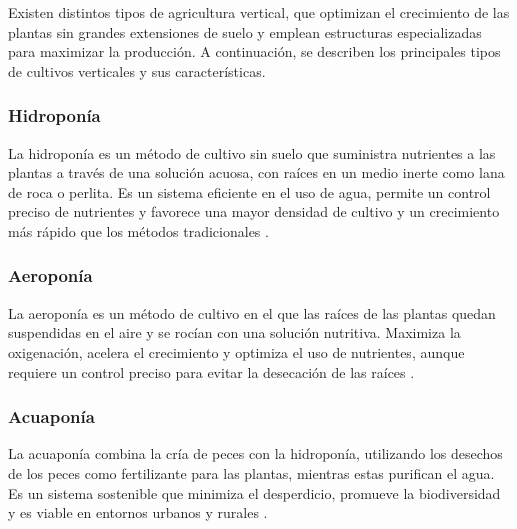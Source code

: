 

Existen distintos tipos de agricultura vertical, que optimizan el crecimiento de las plantas sin grandes extensiones de suelo y emplean estructuras especializadas para maximizar la producción.
A continuación, se describen los principales tipos de cultivos verticales y sus características.

\subsubsection{Hidroponía}
La hidroponía es un método de cultivo sin suelo que suministra nutrientes a las plantas a través de una solución acuosa, con raíces en un medio inerte como lana de roca o perlita. Es un sistema eficiente en el uso de agua, permite un control preciso de nutrientes y favorece una mayor densidad de cultivo y un crecimiento más rápido que los métodos tradicionales \cite{SANTANDER} \cite{CULTIVOS:TIPOS}.
\subsubsection{Aeroponía}
La aeroponía es un método de cultivo en el que las raíces de las plantas quedan suspendidas en el aire y se rocían con una solución nutritiva. Maximiza la oxigenación, acelera el crecimiento y optimiza el uso de nutrientes, aunque requiere un control preciso para evitar la desecación de las raíces \cite{SANTANDER} \cite{CULTIVOS:TIPOS}.
\subsubsection{Acuaponía}
La acuaponía combina la cría de peces con la hidroponía, utilizando los desechos de los peces como fertilizante para las plantas, mientras estas purifican el agua. Es un sistema sostenible que minimiza el desperdicio, promueve la biodiversidad y es viable en entornos urbanos y rurales \cite{CULTIVOS:TIPOS}.

